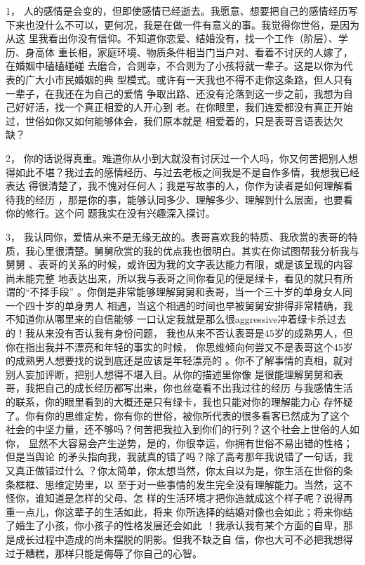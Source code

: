 \documentclass[12pt]{book}
\begin{document}
1，    人的感情是会变的，但即使感情已经逝去。我愿意、想要把自己的感情经历写
下来也没什么不可以，更何况，我是在做一件有意义的事。我觉得你世俗，是因为从这
里我看出你没有信仰。不知道你恋爱、结婚没有，找一个工作（阶层）、学历、身高体
重长相，家庭环境、物质条件相当门当户对、看着不讨厌的人嫁了，在婚姻中磕磕碰碰
去磨合，合则幸，不合则为了小孩将就一辈子。这是以你为代表的广大小市民婚姻的典
型模式。或许有一天我也不得不走你这条路，但人只有一辈子，在我还在为自己的爱情
争取出路、还没有沦落到这一步之前，我想为自己好好活，找一个真正相爱的人开心到
老。在你眼里，我们连爱都没有真正开始过，世俗如你又如何能够体会，我们原本就是
相爱着的，只是表哥言语表达欠缺？

2，    你的话说得真重。难道你从小到大就没有讨厌过一个人吗，你又何苦把别人想
得如此不堪？我过去的感情经历、与过去老板之间我是不是自作多情，我想我已经表达
得很清楚了，我不愧对任何人；我是写故事的人，你作为读者是如何理解看待我的经历
，那是你的事，能够认同多少、理解多少、理解到什么层面，也要看你的修行。这个问
题我实在没有兴趣深入探讨。

3，    我认同你，爱情从来不是无缘无故的。表哥喜欢我的特质、我欣赏的表哥的特
质，我心里很清楚。舅舅欣赏的我的优点我也很明白。其实在你试图帮我分析我与舅舅
、表哥的关系的时候，或许因为我的文字表达能力有限，或是该呈现的内容尚未能完整
地表达出来，所以我与表哥之间你看见的便是绿卡，看见的就只有所谓的“不择手段”
。你倒是非常能够理解舅舅和表哥，当一个三十岁的单身女人同一个四十岁的单身男人
相遇，当这个相遇的时间也早被舅舅安排得非常精确，我不知道你从哪里来的自信能够
一口认定我就是那么很aggressive冲着绿卡杀过去的！我从来没有否认我有身份问题，
我也从来不否认表哥是45岁的成熟男人，但你在指出我并不漂亮和年轻的事实的时候，
你思维倾向何尝又不是表哥这个45岁的成熟男人想要找的说到底还是应该是年轻漂亮的
。你不了解事情的真相，就对别人妄加评断，把别人想得不堪入目。从你的描述里你像
是很能理解舅舅和表哥，我把自己的成长经历都写出来，你也丝毫看不出我过往的经历
与我感情生活的联系，你的眼里看到的大概还是只有绿卡，我也只能对你的理解能力心
存怀疑了。你有你的思维定势，你有你的世俗，被你所代表的很多看客已然成为了这个
社会的中坚力量，还不够吗？何苦把我拉入到你们的行列？这个社会上世俗的人如你，
显然不大容易会产生逆势，是的，你很幸运，你拥有世俗不易出错的性格；但是当舆论
的矛头指向我，我就真的错了吗？除了高考那年我说错了一句话，我又真正做错过什么
？你太简单，你太想当然，你太自以为是，你生活在世俗的条条框框、思维定势里，以
至于对一些事情的发生完全没有理解能力。当然，这不怪你，谁知道是怎样的父母、怎
样的生活环境才把你造就成这个样子呢？说得再重一点儿，你这辈子的生活如此，将来
你所选择的结婚对像也会如此；将来你结了婚生了小孩，你小孩子的性格发展还会如此
！我承认我有某个方面的自卑，那是成长过程中造成的尚未摆脱的阴影。但我不缺乏自
信，你也大可不必把我想得过于糟糕，那样只能是侮辱了你自己的心智。
\end{document}
